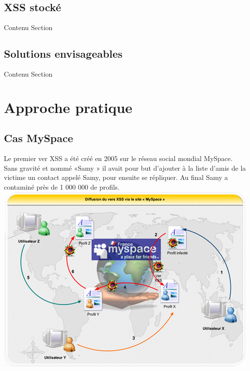 \documentclass[a4paper,12pt]{report}
\begin{document}
		\newpage

	\section{XSS stocké}
		Contenu Section 
		

		\newpage
	\section{Solutions envisageables}
		Contenu Section 
		

		\newpage
	\chapter{Approche pratique} %
		
	\section{Cas MySpace}
Le premier ver XSS a été créé en 2005 sur le réseau social mondial MySpace. Sans gravité et nommé «Samy » il avait pour but d’ajouter à la liste d’amis de la victime un contact appelé Samy, pour ensuite se répliquer. Au final Samy a contaminé près de 1 000 000 de profils. \\

\includegraphics{images/versmyspace.jpg}\\
\end{document}

